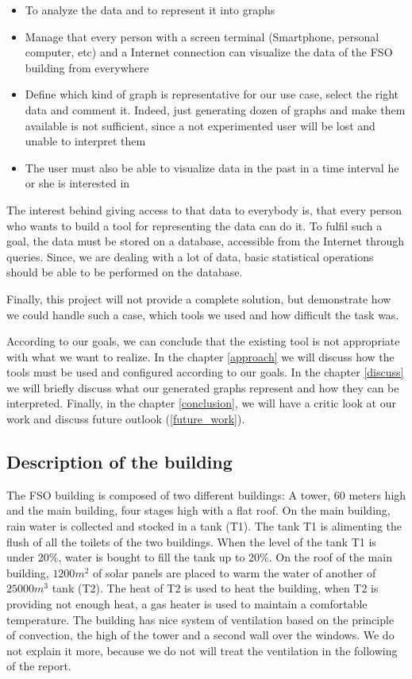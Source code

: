\documentclass{acm_proc_article-sp}
\begin{document}
\begin{itemize}
\item To analyze the data and to represent it into graphs
\item Manage that every person with a screen terminal (Smartphone, personal computer, etc) and a Internet connection can visualize the data of the FSO building from everywhere
\item Define which kind of graph is representative for our use case, select the right data and comment it. Indeed, just generating dozen of graphs and make them available is not sufficient, since a not experimented user will be lost and unable to interpret them
\item The user must also be able to visualize data in the past in a time interval he or she is interested in
\end{itemize}

The interest behind giving access to that data to everybody is, that every person who wants to build a tool for representing the data can do it. To fulfil such a goal, the data must be stored on a database, accessible from the Internet through queries. Since, we are dealing with a lot of data, basic statistical operations should be able to be performed on the database.

Finally, this project will not provide a complete solution, but demonstrate how we could handle such a case, which tools we used and how difficult the task was.

According to our goals, we can conclude that the existing tool is not appropriate with what we want to realize. In the chapter \ref{approach} we will discuss how the tools must be used and configured according to our goals. In the chapter \ref{discuss} we will briefly discuss what our generated graphs represent and how they can be interpreted. Finally, in the chapter \ref{conclusion}, we will have a critic look at our work and discuss future outlook (\ref{future_work}).

\subsection{Description of the building}
The FSO building is composed of two different buildings: A tower, 60 meters high and the main building, four stages high with a flat roof. On the main building, rain water is collected and stocked in a tank (T1). The tank T1 is alimenting the flush of all the toilets of the two buildings. When the level of the tank T1 is under 20\%, water is bought to fill the tank up to 20\%. On the roof of the main building, $1200 m^2$ of solar panels are placed to warm the water of another of $25000m^3$ tank (T2). The heat of T2 is used to heat the building, when T2 is providing not enough heat, a gas heater is used to maintain a comfortable temperature. The building has nice system of ventilation based on the principle of convection, the high of the tower and a second wall over the windows. We do not explain it more, because we do not will treat the ventilation in the following of the report.
\end{document}
